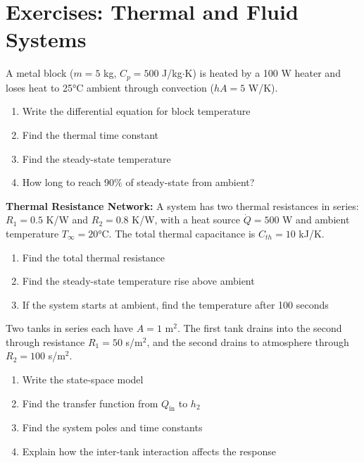 \section{Exercises: Thermal and Fluid Systems}

\begin{exercise}
A metal block ($m = 5$ kg, $C_p = 500$ J/kg$\cdot$K) is heated by a 100 W heater and loses heat to 25°C ambient through convection ($hA = 5$ W/K).
\begin{enumerate}[label=(\alph*)]
    \item Write the differential equation for block temperature
    \item Find the thermal time constant
    \item Find the steady-state temperature
    \item How long to reach 90\% of steady-state from ambient?
\end{enumerate}
\end{exercise}

\begin{exercise}
\textbf{Thermal Resistance Network:} A system has two thermal resistances in series: $R_1 = 0.5$ K/W and $R_2 = 0.8$ K/W, with a heat source $\dot{Q} = 500$ W and ambient temperature $T_\infty = 20$°C. The total thermal capacitance is $C_{th} = 10$ kJ/K.
\begin{enumerate}[label=(\alph*)]
    \item Find the total thermal resistance
    \item Find the steady-state temperature rise above ambient
    \item If the system starts at ambient, find the temperature after 100 seconds
\end{enumerate}
\end{exercise}

\begin{exercise}
Two tanks in series each have $A = 1$ m$^2$. The first tank drains into the second through resistance $R_1 = 50$ s/m$^2$, and the second drains to atmosphere through $R_2 = 100$ s/m$^2$.
\begin{enumerate}[label=(\alph*)]
    \item Write the state-space model
    \item Find the transfer function from $Q_{\text{in}}$ to $h_2$
    \item Find the system poles and time constants
    \item Explain how the inter-tank interaction affects the response
\end{enumerate}
\end{exercise}


